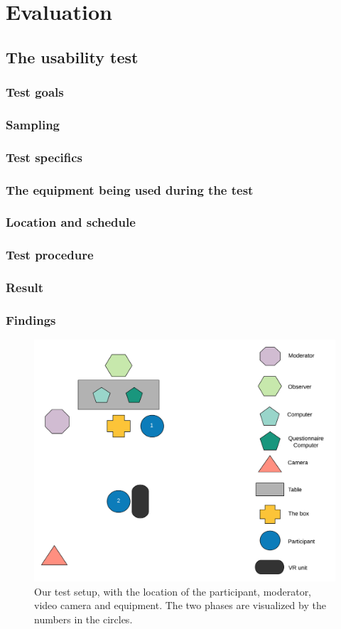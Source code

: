 \chapter{Evaluation}

\section{The usability test}

\subsection{Test goals}

\subsection{Sampling}

\subsection{Test specifics}

\subsection*{The equipment being used during the test}

\subsection*{Location and schedule}

\subsection*{Test procedure}

\subsection{Result}

\subsection{Findings}


\begin{figure}[H]
	\centering
	\includegraphics[width=1\linewidth]{figure/Evaluation/Test1.png}
	\caption{Our test setup, with the location of the participant, moderator, video camera and equipment. The two phases are visualized by the numbers in the circles.}
	\label{fig:test1}
\end{figure}